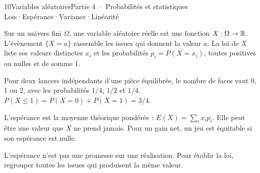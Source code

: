 \begin{ouverture}[sommes]{10}{Variables aléatoires}{Partie 4 · Probabilités et statistiques}
{Lois\enspace·\enspace Espérance\enspace·\enspace Variance\enspace·\enspace Linéarité}
\end{ouverture}
\essentiel
{}
\begin{definition}
Sur un univers fini $\Omega$, une variable aléatoire réelle est une fonction
$X:\Omega\to\mathbb{R}$. L'évènement $\{X=a\}$ rassemble les issues qui donnent la valeur $a$.
La loi de $X$ liste ses valeurs distinctes $x_i$ et les probabilités
$p_i=P(X=x_i)$, toutes positives ou nulles et de somme 1.
\end{definition}
\begin{exemple}
Pour deux lancers indépendants d'une pièce équilibrée, le nombre de faces
vaut 0, 1 ou 2, avec les probabilités $1/4$, $1/2$ et $1/4$.
$P(X\leq1)=P(X=0)+P(X=1)=3/4$.
\end{exemple}
\begin{center}
\par{}
\end{center}

\begin{definition}
L'espérance est la moyenne théorique pondérée : $E(X)=\sum_i x_ip_i$.
Elle peut être une valeur que $X$ ne prend jamais. Pour un gain net, un jeu
est équitable si son espérance est nulle.
\end{definition}
\begin{attention}
L'espérance n'est pas une promesse sur une réalisation. Pour établir la loi,
regrouper toutes les issues qui produisent la même valeur.
\end{attention}

